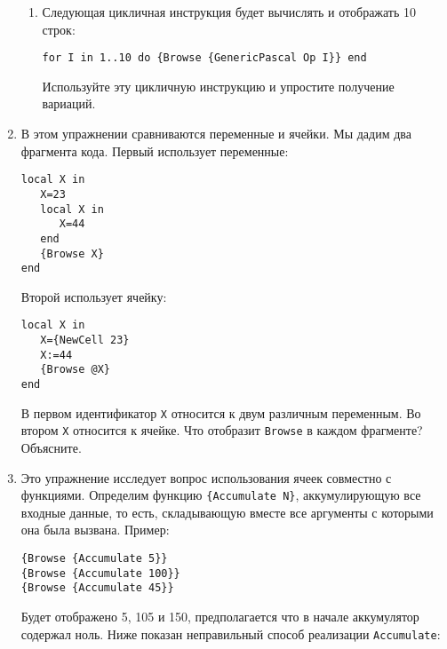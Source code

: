 \begin{enumerate}
{\begin{enumerate}
{\begin{lstlisting}
fun {Mul1 X Y} (X+1)*(Y+1) end
\end{lstlisting}

Как будет выглядеть 10-я строка, вычисленная с помощью \lstinline|Mul1|?
 
}

 \item{ 
Следующая цикличная инструкция будет вычислять и отображать 10 строк:

\begin{lstlisting} 
for I in 1..10 do {Browse {GenericPascal Op I}} end
 \end{lstlisting}

Используйте эту цикличную инструкцию и упростите получение вариаций.}
\end{enumerate}


}

\item{
В этом упражнении сравниваются переменные и ячейки. Мы дадим два фрагмента кода. Первый использует переменные:

\begin{lstlisting}
local X in
   X=23
   local X in
      X=44
   end
   {Browse X}
end
\end{lstlisting}

Второй использует ячейку:

\begin{lstlisting}
local X in
   X={NewCell 23}
   X:=44
   {Browse @X}
end
\end{lstlisting}

В первом идентификатор \lstinline|X| относится к двум различным переменным. Во втором \lstinline|X| относится к ячейке. Что отобразит \lstinline|Browse| в каждом фрагменте? Объясните.
}

\item{Это упражнение исследует вопрос использования ячеек совместно с функциями. Определим функцию \lstinline|{Accumulate N}|, аккумулирующую все входные данные, то есть, складывающую вместе все аргументы с которыми она была вызвана. Пример:

  \begin{lstlisting}
{Browse {Accumulate 5}}
{Browse {Accumulate 100}}
{Browse {Accumulate 45}}
  \end{lstlisting}
  
Будет отображено 5, 105 и 150, предполагается что в начале аккумулятор содержал ноль. Ниже показан неправильный способ реализации \lstinline|Accumulate|:

}
\end{enumerate}
